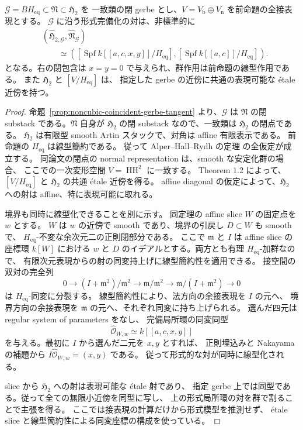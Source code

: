 \begin{theorem}[一致類に沿う形式的な対の線型化]
\label{thm:noncubic-coincident-formal-pair}
$\mathcal G=BH_{\mathrm{eq}}\subset\mathfrak N\subset\mathfrak H_2$ を
一致類の閉 gerbe とし、$V=V_{\mathrm b}\oplus V_{\mathrm n}$ を前命題の全接表現とする。
$\mathcal G$ に沿う形式完備化の対は、非標準的に
\[
 \begin{aligned}
 &(\widehat{\mathfrak H}_{2,\mathcal G},\widehat{\mathfrak N}_{\mathcal G})\\
 &\qquad\simeq
 \left(
 [\operatorname{Spf}k[[a,c,x,y]]/H_{\mathrm{eq}}],
 [\operatorname{Spf}k[[a,c]]/H_{\mathrm{eq}}]
 \right).
 \end{aligned}
\]
となる。右の閉包含は $x=y=0$ で与えられ、群作用は前命題の線型作用である。
また $\mathfrak H_2$ と $[V/H_{\mathrm{eq}}]$ は、
指定した gerbe の近傍に共通の表現可能な \texorpdfstring{\'etale}{etale} 近傍を持つ。
\end{theorem}
\begin{proof}
命題~\ref{prop:noncubic-coincident-gerbe-tangent} より、$\mathcal G$ は
$\mathfrak N$ の閉 substack である。$\mathfrak N$ 自身が $\mathfrak H_2$ の閉 substack
なので、一致類は $\mathfrak H_2$ の閉点である。
$\mathfrak H_2$ は有限型 smooth Artin スタックで、対角は affine 有限表示である。
前命題の $H_{\mathrm{eq}}$ は線型簡約である。
従って Alper--Hall--Rydh の定理
\cite[Theorems 1.1, 1.2]{AlperHallRydh2020} の全仮定が成立する。
同論文の閉点の normal representation は、smooth な安定化群の場合、
ここでの一次変形空間 $V=\operatorname{HH}^2$ に一致する。
Theorem 1.2 によって、$[V/H_{\mathrm{eq}}]$ と $\mathfrak H_2$ の共通
\texorpdfstring{\'etale}{etale} 近傍を得る。
affine diagonal の仮定によって、$\mathfrak H_2$ への射は affine、特に表現可能に取れる。

境界も同時に線型化できることを別に示す。
同定理の affine slice $W$ の固定点を $w$ とする。
$W$ は $w$ の近傍で smooth であり、境界の引戻し $D\subset W$ も smooth で、
$H_{\mathrm{eq}}$-不変な余次元二の正則閉部分である。
ここで $\mathfrak m$ と $I$ は affine slice の座標環 $k[W]$ における
$w$ と $D$ のイデアルとする。両方とも有理 $H_{\mathrm{eq}}$-加群なので、
有限次元表現からの射の同変持上げに線型簡約性を適用できる。
接空間の双対の完全列
\[
 0\longrightarrow (I+\mathfrak m^2)/\mathfrak m^2
 \longrightarrow\mathfrak m/\mathfrak m^2
 \longrightarrow\mathfrak m/(I+\mathfrak m^2)\longrightarrow0
\]
は $H_{\mathrm{eq}}$-同変に分裂する。
線型簡約性により、法方向の余接表現を $I$ の元へ、
境界方向の余接表現を $\mathfrak m$ の元へ、それぞれ同変に持ち上げられる。
選んだ四元は regular system of parameters をなし、
完備局所環の同変同型
\[
 \widehat{\mathcal O}_{W,w}\simeq k[[a,c,x,y]]
\]
を与える。最初に $I$ から選んだ二元を $x,y$ とすれば、
正則埋込みと Nakayama の補題から $I\widehat{\mathcal O}_{W,w}=(x,y)$ である。
従って形式的な対が同時に線型化される。

slice から $\mathfrak H_2$ への射は表現可能な \texorpdfstring{\'etale}{etale} 射であり、
指定 gerbe 上では同型である。従って全ての無限小近傍を同型に写し、
上の形式局所環の対を群で割ることで主張を得る。
ここでは接表現の計算だけから形式模型を推測せず、
\texorpdfstring{\'etale}{etale} slice と線型簡約性による同変座標の構成を使っている。
\end{proof}

